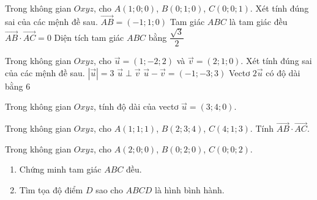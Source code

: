 \begin{ex}
  Trong không gian $Oxyz$, cho $A(1;0;0)$, $B(0;1;0)$, $C(0;0;1)$. Xét tính đúng sai của các mệnh đề sau.
  \choiceTF
    {\True $\overrightarrow{AB}=(-1;1;0)$}
    {\True Tam giác $ABC$ là tam giác đều}
    {$\overrightarrow{AB}\cdot\overrightarrow{AC}=0$}
    {\True Diện tích tam giác $ABC$ bằng $\dfrac{\sqrt3}{2}$}
\end{ex}

\begin{ex}
  Trong không gian $Oxyz$, cho $\vec u=(1;-2;2)$ và $\vec v=(2;1;0)$. Xét tính đúng sai của các mệnh đề sau.
  \choiceTF
    {\True $|\vec u|=3$}
    {\True $\vec u\perp\vec v$}
    {$\vec u-\vec v=(-1;-3;3)$}
    {\True Vectơ $2\vec u$ có độ dài bằng $6$}
\end{ex}

\begin{ex}
  Trong không gian $Oxyz$, tính độ dài của vectơ $\vec u=(3;4;0)$.
\end{ex}

\begin{ex}
  Trong không gian $Oxyz$, cho $A(1;1;1)$, $B(2;3;4)$, $C(4;1;3)$. Tính $\overrightarrow{AB}\cdot\overrightarrow{AC}$.
\end{ex}

\begin{ex}
  Trong không gian $Oxyz$, cho $A(2;0;0)$, $B(0;2;0)$, $C(0;0;2)$.
  \begin{enumerate}[label=\alph*)]
    \item Chứng minh tam giác $ABC$ đều.
    \item Tìm tọa độ điểm $D$ sao cho $ABCD$ là hình bình hành.
  \end{enumerate}
\end{ex}
